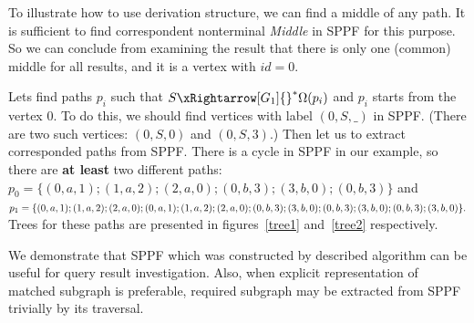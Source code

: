 To illustrate how to use derivation structure, we can find a middle of any path. It is sufficient to find correspondent nonterminal \textit{Middle} in SPPF for this purpose.
So we can conclude from examining the result that there is only one (common) middle for all results, and it is a vertex with $id = 0$.

Lets find paths $p_i$ such that $S {\xRightarrow[G_1]{}}^{*} \Omega(p_i)$ and $p_i$ starts from the vertex $0$.
To do this, we should find vertices with label $(0, S, \_)$ in SPPF.
(There are two such vertices: $(0, S, 0)$ and $(0, S, 3)$.)
Then let us to extract corresponded paths from SPPF.
There is a cycle in SPPF in our example, so there are \textbf{at least} two different paths: $p_0=\{(0,a,1);(1,a,2);(2,a,0);(0,b,3);(3,b,0);(0,b,3)\}$ and 
$
p_1=\{(0,a,1);(1,a,2);(2,a,0);(0,a,1);(1,a,2);(2,a,0);(0,b,3);(3,b,0);(0,b,3);\\(3,b,0);(0,b,3);(3,b,0)\}.
$ Trees for these paths are presented in figures~\ref{tree1} and~\ref{tree2} respectively.

We demonstrate that SPPF which was constructed by described algorithm can be useful for query result investigation. 
Also, when explicit representation of matched subgraph is preferable, required subgraph may be extracted from SPPF trivially by its traversal.
